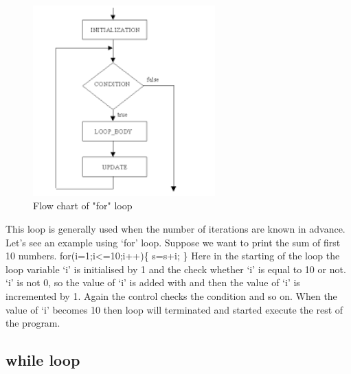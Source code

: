 \documentclass[conference]{IEEEtran}
\begin{document}
{\begin{figure}[h!]
\centering
\includegraphics[width=70mm]{for.png}
\caption{Flow chart of "for" loop}
\label{fig:method}
\end{figure}

	This loop is generally used when the number of iterations are known in advance. Let’s see an example using ‘for’ loop. Suppose we want to print the sum of first 10 numbers.
\linebreak
\linebreak
\hspace*{1cm}for(i=1;i<=10;i++)\{
\linebreak
\hspace*{2cm}s=s+i;
\linebreak
\hspace*{3cm}\}
\linebreak
Here in the starting of the loop the loop variable ‘i’ is initialised by 1 and the check whether ‘i’ is equal to 10 or not. ‘i’ is not 0, so the value of ‘i’ is added with and then the value of ‘i’ is incremented by 1. Again the control checks the condition and so on. When the value of ‘i’ becomes 10 then loop will terminated and started execute the rest of the program.

\subsection{while loop}

}
\end{document}

